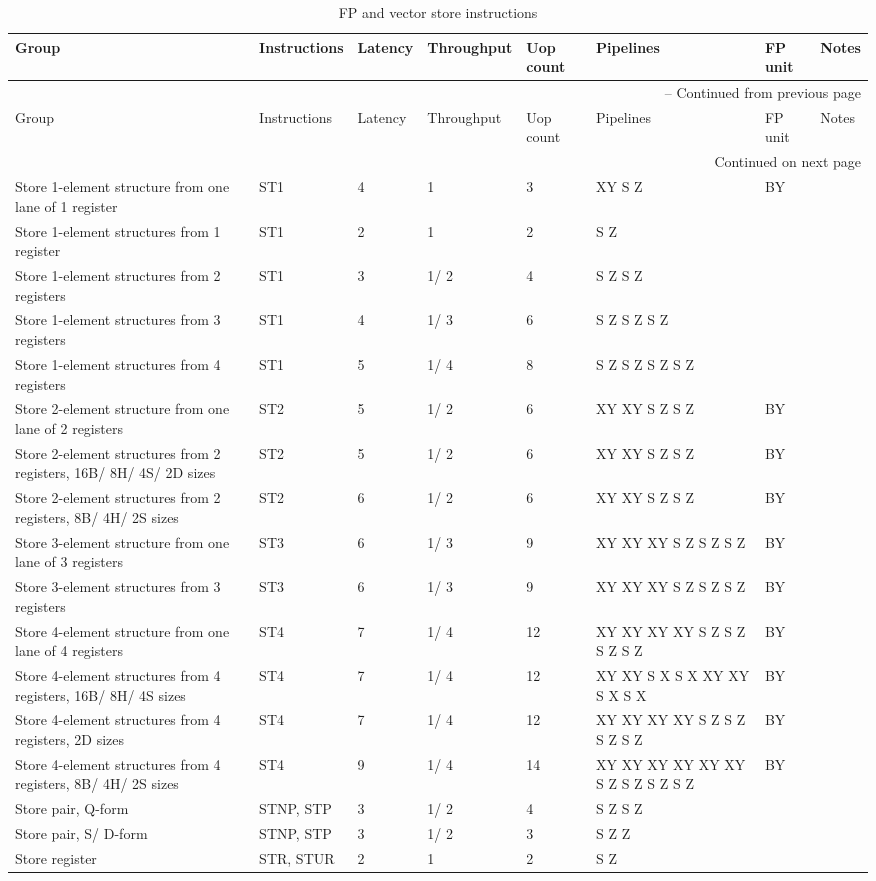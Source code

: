 \begin{longtable}{|p{1in}|p{1in}|l|l|l|p{1in}|l|p{1in}|}
\caption{FP and vector store instructions} \\
\hline
Group & Instructions & Latency & Throughput & Uop count & Pipelines & FP unit & Notes\\
\hline
\endfirsthead
\hline
\multicolumn{8}{|r|}{{\tablename\ \thetable{} -- Continued from previous page}} \\
\hline
Group & Instructions & Latency & Throughput & Uop count & Pipelines & FP unit & Notes\\
\hline
\endhead
\hline
\multicolumn{8}{|r|}{{Continued on next page}} \\
\hline
\endfoot
\hline
\endlastfoot
Store 1-element structure from one lane of 1 register & ST1 & 4 & 1 & 3 & XY S Z & BY & \\
\hline
Store 1-element structures from 1 register & ST1 & 2 & 1 & 2 & S Z &  & \\
\hline
Store 1-element structures from 2 registers & ST1 & 3 & 1/ 2 & 4 & S Z S Z &  & \\
\hline
Store 1-element structures from 3 registers & ST1 & 4 & 1/ 3 & 6 & S Z S Z S Z &  & \\
\hline
Store 1-element structures from 4 registers & ST1 & 5 & 1/ 4 & 8 & S Z S Z S Z S Z &  & \\
\hline
Store 2-element structure from one lane of 2 registers & ST2 & 5 & 1/ 2 & 6 & XY XY S Z S Z & BY & \\
\hline
Store 2-element structures from 2 registers, 16B/ 8H/ 4S/ 2D sizes & ST2 & 5 & 1/ 2 & 6 & XY XY S Z S Z & BY & \\
\hline
Store 2-element structures from 2 registers, 8B/ 4H/ 2S sizes & ST2 & 6 & 1/ 2 & 6 & XY XY S Z S Z & BY & \\
\hline
Store 3-element structure from one lane of 3 registers & ST3 & 6 & 1/ 3 & 9 & XY XY XY S Z S Z S Z & BY & \\
\hline
Store 3-element structures from 3 registers & ST3 & 6 & 1/ 3 & 9 & XY XY XY S Z S Z S Z & BY & \\
\hline
Store 4-element structure from one lane of 4 registers & ST4 & 7 & 1/ 4 & 12 & XY XY XY XY S Z S Z S Z S Z & BY & \\
\hline
Store 4-element structures from 4 registers, 16B/ 8H/ 4S sizes & ST4 & 7 & 1/ 4 & 12 & XY XY S X S X XY XY S X S X & BY & \\
\hline
Store 4-element structures from 4 registers, 2D sizes & ST4 & 7 & 1/ 4 & 12 & XY XY XY XY S Z S Z S Z S Z & BY & \\
\hline
Store 4-element structures from 4 registers, 8B/ 4H/ 2S sizes & ST4 & 9 & 1/ 4 & 14 & XY XY XY XY XY XY S Z S Z S Z S Z & BY & \\
\hline
Store pair, Q-form & STNP, STP & 3 & 1/ 2 & 4 & S Z S Z &  & \\
\hline
Store pair, S/ D-form & STNP, STP & 3 & 1/ 2 & 3 & S Z Z &  & \\
\hline
Store register & STR, STUR & 2 & 1 & 2 & S Z &  & \\
\hline
\end{longtable}
